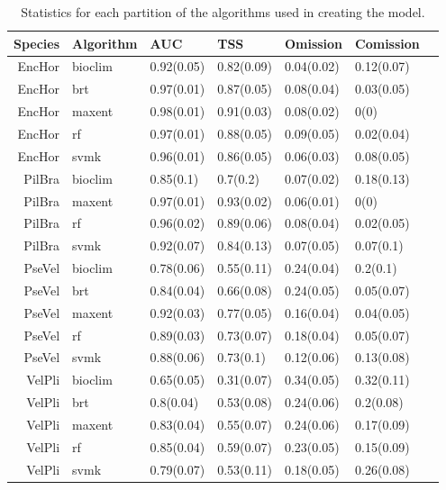 \begin{table}[ht]
\label{evaluate_summary}
 \caption{Statistics for each partition of the algorithms used in creating the model.}
\begin{tabular}{rllllll}
  \hline
 Species  & Algorithm & AUC & TSS & Omission & Comission \\ 
  \hline
 EncHor & bioclim & 0.92(0.05) & 0.82(0.09) & 0.04(0.02) & 0.12(0.07) \\ 
 EncHor & brt & 0.97(0.01) & 0.87(0.05) & 0.08(0.04) & 0.03(0.05) \\ 
 EncHor & maxent & 0.98(0.01) & 0.91(0.03) & 0.08(0.02) & 0(0) \\ 
 EncHor & rf & 0.97(0.01) & 0.88(0.05) & 0.09(0.05) & 0.02(0.04) \\ 
 EncHor & svmk & 0.96(0.01) & 0.86(0.05) & 0.06(0.03) & 0.08(0.05) \\ 
 PilBra & bioclim & 0.85(0.1) & 0.7(0.2) & 0.07(0.02) & 0.18(0.13) \\ 
 PilBra & maxent & 0.97(0.01) & 0.93(0.02) & 0.06(0.01) & 0(0) \\ 
 PilBra & rf & 0.96(0.02) & 0.89(0.06) & 0.08(0.04) & 0.02(0.05) \\ 
 PilBra & svmk & 0.92(0.07) & 0.84(0.13) & 0.07(0.05) & 0.07(0.1) \\ 
PseVel & bioclim & 0.78(0.06) & 0.55(0.11) & 0.24(0.04) & 0.2(0.1) \\ 
PseVel & brt & 0.84(0.04) & 0.66(0.08) & 0.24(0.05) & 0.05(0.07) \\ 
 PseVel & maxent & 0.92(0.03) & 0.77(0.05) & 0.16(0.04) & 0.04(0.05) \\ 
PseVel & rf & 0.89(0.03) & 0.73(0.07) & 0.18(0.04) & 0.05(0.07) \\ 
 PseVel & svmk & 0.88(0.06) & 0.73(0.1) & 0.12(0.06) & 0.13(0.08) \\ 
VelPli & bioclim & 0.65(0.05) & 0.31(0.07) & 0.34(0.05) & 0.32(0.11) \\ 
VelPli & brt & 0.8(0.04) & 0.53(0.08) & 0.24(0.06) & 0.2(0.08) \\ 
 VelPli & maxent & 0.83(0.04) & 0.55(0.07) & 0.24(0.06) & 0.17(0.09) \\ 
 VelPli & rf & 0.85(0.04) & 0.59(0.07) & 0.23(0.05) & 0.15(0.09) \\ 
  VelPli & svmk & 0.79(0.07) & 0.53(0.11) & 0.18(0.05) & 0.26(0.08) \\ 
   \hline
\end{tabular}
\end{table}


